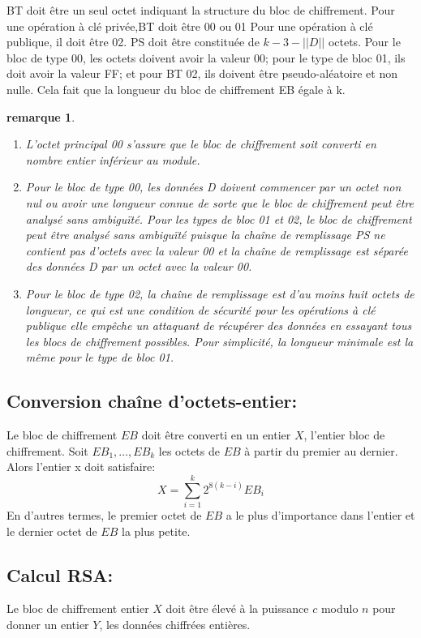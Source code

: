 \documentclass{article}
\newtheorem{remark}{remarque}
\begin{document}
BT doit être un seul octet indiquant la structure du bloc de chiffrement. Pour une opération à clé privée,BT doit être 00 ou 01 Pour une opération à clé publique, il doit être 02.
PS doit être constituée de $k-3-|| D ||$ octets. Pour le bloc de type 00, les octets doivent avoir la valeur 00; pour le type de bloc 01, ils doit avoir la valeur FF; et pour BT 02, ils doivent être pseudo-aléatoire et non nulle. Cela fait que la longueur du bloc de chiffrement EB égale à k.\\
\begin{remark}
\par\leavevmode\par
\begin{enumerate}
    \item L'octet principal 00 s'assure que le bloc de chiffrement soit converti en nombre entier inférieur au module.
    \item Pour le bloc de type 00, les données D doivent commencer par un octet non nul ou avoir une longueur connue de sorte que le bloc de chiffrement peut être analysé sans ambiguïté. Pour les types de bloc 01 et 02, le bloc de chiffrement peut être analysé sans ambiguïté puisque la chaîne de remplissage PS ne contient pas d'octets avec la valeur 00 et la chaîne de remplissage est séparée des données D par un octet avec la valeur 00.
    \item Pour le bloc de type 02, la chaîne de remplissage est d’au moins huit octets de longueur, ce qui est une condition de sécurité pour les opérations à clé publique elle empêche un attaquant de récupérer des données en essayant tous les blocs de chiffrement possibles. Pour simplicité, la longueur minimale est la même pour le type de bloc 01.
\end{enumerate}
\end{remark}
\subsection{Conversion chaîne d'octets-entier:}
Le bloc de chiffrement $EB$ doit être converti en un entier $X$, l’entier bloc de chiffrement. Soit $EB_{1},\ldots,EB_{k}$ les octets de $EB$ à partir du premier au dernier. Alors l'entier x doit satisfaire:
$$ X=\sum \limits_{i=1}^{k}2^{8(k-i)}EB_{i} $$
En d'autres termes, le premier octet de $EB$ a le plus d'importance dans l'entier et le dernier octet de $EB$ la plus petite.

\subsection{Calcul RSA:}
Le bloc de chiffrement entier $X$ doit être élevé à la puissance $c$ modulo $n$ pour donner un entier $Y$, les données chiffrées entières.
 
\end{document}
